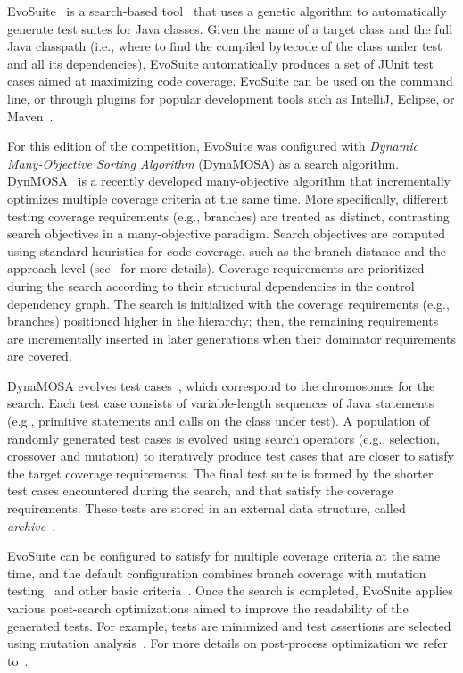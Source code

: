 \documentclass[sigconf,table]{acmart}
\newcommand{\EVOSUITE}{{\sc EvoSuite}\xspace}
\begin{document}
\EVOSUITE~\cite{FrA11c} is a search-based tool~\cite{GoA_TSE12} that
uses a genetic algorithm to automatically generate test suites for
Java classes. Given the name of a target class and the full Java
classpath (i.e., where to find the compiled bytecode of the class
under test and all its dependencies), \EVOSUITE automatically produces
a set of JUnit test cases aimed at maximizing code coverage. \EVOSUITE
can be used on the command line, or through plugins for popular
development tools such as IntelliJ, Eclipse, or
Maven~\cite{ICST16_Tool}.

For this edition of the competition, \EVOSUITE was configured with \textit{Dynamic Many-Objective Sorting Algorithm} (DynaMOSA) as a search algorithm. DynMOSA~\cite{dynamosa, panichella:ssbse2018} is a recently developed many-objective algorithm that incrementally optimizes multiple coverage criteria at the same time. More specifically, different testing coverage requirements (e.g., branches) are treated as distinct, contrasting search objectives in a many-objective paradigm. Search objectives are computed using standard heuristics for code coverage, such as the branch distance and the approach level (see~\cite{GoA_TSE12} for more details). Coverage requirements are prioritized during the search according to their structural dependencies in the control dependency graph. The search is initialized with the coverage requirements (e.g., branches) positioned higher in the hierarchy; then, the remaining requirements are incrementally inserted in later generations when their dominator requirements are covered.

DynaMOSA evolves test cases~\cite{dynamosa}, which correspond to the chromosomes for the search. Each test case consists of variable-length sequences of Java statements (e.g., primitive statements and calls on the class under test). A population of randomly generated test cases is evolved using search operators (e.g., selection, crossover and mutation) to iteratively produce test cases that are closer to satisfy the target coverage requirements. The final test suite is formed by the shorter test cases encountered during the search, and that satisfy the coverage requirements. These tests are stored in an external data structure, called \textit{archive}~\cite{mosa,dynamosa}.

\EVOSUITE can be configured to satisfy for multiple coverage criteria at the same time, and the default configuration combines branch coverage with
mutation testing~\cite{emse14_mutation} and other basic
criteria~\cite{rojas2015combining}. Once the search is completed, \EVOSUITE applies various post-search optimizations aimed to improve the readability of
the generated tests. For example, tests are minimized and test assertions are selected using mutation analysis~\cite{10.1109/TSE.2011.93}. For more details on post-process optimization we refer to~\cite{FrA11c,FrA13a}.
\end{document}
